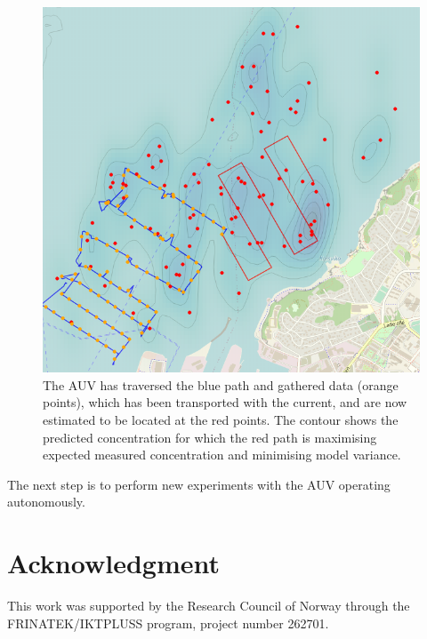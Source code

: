 \documentclass[conference]{IEEEtran}
\begin{document}
\begin{figure}[tbp]
\centerline{\includegraphics[width=\linewidth]{figures/munkholmen_planned_path.png}}
\caption{The AUV has traversed the blue path and gathered data (orange points), which has been transported with the current, and are now estimated to be located at the red points.
The contour shows the predicted concentration for which the red path is maximising expected measured concentration and minimising model variance.}
\label{fig:munkholmen}
\end{figure}

The next step is to perform new experiments with the AUV operating autonomously.
\section*{Acknowledgment}
This work was supported by the Research Council of Norway through the FRINATEK/IKTPLUSS program, project number 262701.
\end{document}
